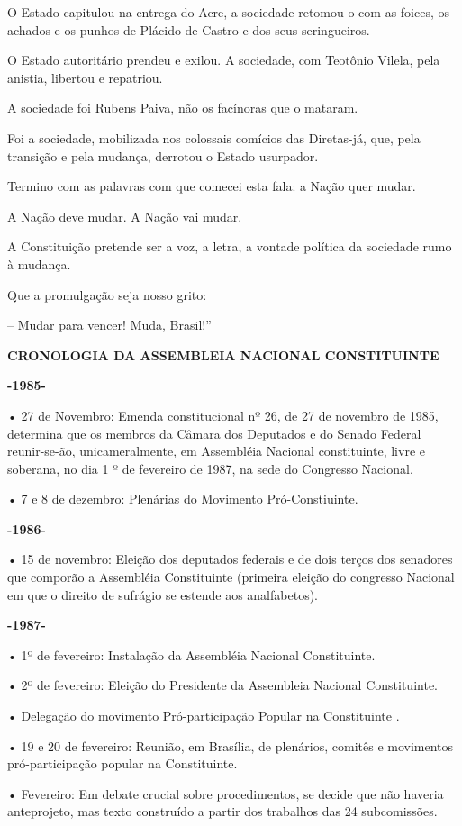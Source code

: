 O Estado capitulou na entrega do Acre, a sociedade retomou-o com as
foices, os achados e os punhos de Plácido de Castro e dos seus
seringueiros.

O Estado autoritário prendeu e exilou. A sociedade, com Teotônio Vilela,
pela anistia, libertou e repatriou.

A sociedade foi Rubens Paiva, não os facínoras que o mataram.

Foi a sociedade, mobilizada nos colossais comícios das Diretas-já, que,
pela transição e pela mudança, derrotou o Estado usurpador.

Termino com as palavras com que comecei esta fala: a Nação quer mudar.

A Nação deve mudar. A Nação vai mudar.

A Constituição pretende ser a voz, a letra, a vontade política da
sociedade rumo à mudança.

Que a promulgação seja nosso grito:

-- Mudar para vencer! Muda, Brasil!''

\textbf{CRONOLOGIA DA ASSEMBLEIA NACIONAL CONSTITUINTE}

\textbf{-1985-}

• 27 de Novembro: Emenda constitucional nº 26, de 27 de novembro de
1985, determina que os membros da Câmara dos Deputados e do Senado
Federal reunir-se-ão, unicameralmente, em Assembléia Nacional
constituinte, livre e soberana, no dia 1 º de fevereiro de 1987, na sede
do Congresso Nacional.

• 7 e 8 de dezembro: Plenárias do Movimento Pró-Constiuinte.

\textbf{-1986-}

• 15 de novembro: Eleição dos deputados federais e de dois terços dos
senadores que comporão a Assembléia Constituinte (primeira eleição do
congresso Nacional em que o direito de sufrágio se estende aos
analfabetos).

\textbf{-1987-}

• 1º de fevereiro: Instalação da Assembléia Nacional Constituinte.

• 2º de fevereiro: Eleição do Presidente da Assembleia Nacional
Constituinte.

• Delegação do movimento Pró-participação Popular na Constituinte .

• 19 e 20 de fevereiro: Reunião, em Brasília, de plenários, comitês e
movimentos pró-participação popular na Constituinte.

• Fevereiro: Em debate crucial sobre procedimentos, se decide que não
haveria anteprojeto, mas texto construído a partir dos trabalhos das 24
subcomissões.

